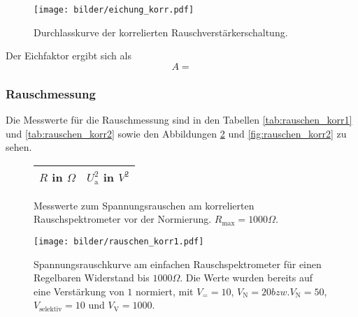 		\begin{figure}
			\centering
			\texttt{[image: bilder/eichung\_korr.pdf]}
			\caption{Durchlasskurve der korrelierten Rauschverstärkerschaltung.}
			\label{fig:eichung_korr}
		\end{figure}
		
		Der Eichfaktor ergibt sich als
		\begin{equation}
			A =   %
		\end{equation}


	
	\subsubsection{Rauschmessung}
		Die Messwerte für die Rauschmessung sind in den Tabellen \ref{tab:rauschen_korr1} 
		und \ref{tab:rauschen_korr2} sowie den Abbildungen 
		\ref{fig:rauschen_korr1} und \ref{fig:rauschen_korr2} zu sehen.
		
		
	\begin{figure}[htbp]

	\begin{minipage}{0.3\textwidth} 

			\centering
			\begin{tabular}{cc}
				\toprule \midrule
				$R$ in $\Omega$ & $U_\text{a}^2$ in $V^2$ \\
				\midrule
							
				\midrule \bottomrule
			\end{tabular}
			\caption{Messwerte zum Spannungsrauschen am korrelierten 
			Rauschspektrometer vor der Normierung. $R_\text{max}=1000 \Omega$.}
			\label{tab:rauschen_korr1}

	\end{minipage}
	
	\hfill
	
	\begin{minipage}{0.7\textwidth}

			\centering
			\texttt{[image: bilder/rauschen\_korr1.pdf]}
			\caption{Spannungsrauschkurve am einfachen Rauschspektrometer für einen 
			Regelbaren Widerstand bis $1000\Omega$. Die Werte wurden bereits auf eine Verstärkung von 
			$1$ normiert, mit $V_= =10$, $V_\text{N}=20 bzw. V_\text{N}=50$, 
			$V_\text{selektiv}=10$ und $V_\text{V}=1000$. }
			\label{fig:rauschen_korr1}
			
	\end{minipage}

	\end{figure}		
	
